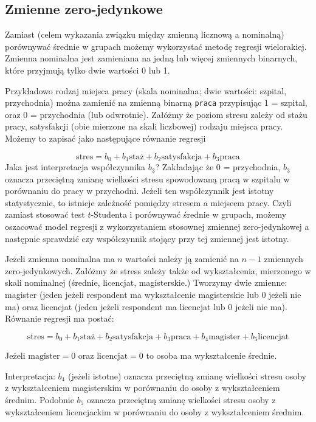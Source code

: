 \documentclass[
  openany]{book}
\begin{document}
\hypertarget{zmienne-zero-jedynkowe}{%
\subsection{Zmienne zero-jedynkowe}\label{zmienne-zero-jedynkowe}}

Zamiast (celem wykazania związku między zmienną licznową a nominalną) porównywać
średnie w grupach możemy wykorzystać metodę regresji
wielorakiej. Zmienna nominalna jest zamieniana na jedną lub więcej
zmiennych binarnych, które przyjmują tylko dwie wartości 0 lub 1.

Przykładowo rodzaj miejsca pracy (skala nominalna; dwie wartości: szpital, przychodnia)
można zamienić na zmienną binarną \texttt{praca} przypisując 1 = szpital, oraz
0 = przychodnia (lub odwrotnie). Załóżmy że poziom stresu zależy od stażu pracy, satysfakcji
(obie mierzone na skali liczbowej)
rodzaju miejsca pracy. Możemy to zapisać jako następujące równanie regresji

\[\textrm{stres} = b_0 + b_1\textrm{staż} + b_2 \textrm{satysfakcja} + b_3 \textrm{praca}\]
Jaka jest interpretacja współczynnika \(b_3\)? Zakładając że 0 = przychodnia, \(b_3\) oznacza
przeciętną zmianę wielkości stresu
spowodowaną pracą w szpitalu w porównaniu do pracy w przychodni. Jeżeli ten współczynnik jest istotny
statystycznie, to istnieje zależność pomiędzy stresem a miejscem pracy. Czyli zamiast
stosować test \(t\)-Studenta i porównywać średnie w grupach,
możemy oszacować model regresji z wykorzystaniem stosownej
zmiennej zero-jedynkowej a następnie sprawdzić czy współczynnik stojący przy tej zmiennej jest istotny.

Jeżeli zmienna nominalna ma \(n\) wartości należy ją zamienić na \(n-1\) zmiennych zero-jedynkowych.
Załóżmy że stress zależy także od wykształcenia, mierzonego w skali nominalnej
(średnie, licencjat, magisterskie.) Tworzymy dwie zmienne:
magister (jeden jeżeli respondent ma wykształcenie magisterskie lub 0 jeżeli nie ma)
oraz licencjat (jeden jeżeli respondent ma licencjat lub 0 jeżeli nie ma). Równanie
regresji ma postać:

\[\textrm{stres} = b_0 + b_1\textrm{staż} + b_2 \textrm{satysfakcja} + b_3 \textrm{praca}
+ b_4 \textrm{magister} + b_5 \textrm{licencjat} \]

Jeżeli \(\textrm{magister} = 0\) oraz \(\textrm{licencjat} = 0\) to osoba ma wykształcenie średnie.

Interpretacja: \(b_4\) (jeżeli istotne) oznacza przeciętną zmianę wielkości stresu osoby z wykształceniem magisterskim w porównaniu do osoby z wykształceniem średnim. Podobnie \(b_5\) oznacza przeciętną zmianę
wielkości stresu osoby z wykształceniem licencjackim
w porównaniu do osoby z wykształceniem średnim.
\end{document}
